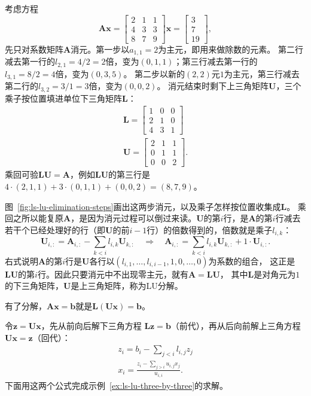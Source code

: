 \begin{example}[三阶消元与LU分解]
\label{ex:ls-lu-three-by-three}
考虑方程
\[
 \bm A\bm x=\begin{bmatrix}2&1&1\\4&3&3\\8&7&9\end{bmatrix}\bm x
 =\begin{bmatrix}3\\7\\19\end{bmatrix},
\]
先只对系数矩阵$\bm A$消元。第一步以$a_{1,1}=2$为主元，即用来做除数的元素。
第二行减去第一行的$l_{2,1}=4/2=2$倍，变为$(0,1,1)$；第三行减去第一行的$l_{3,1}=8/2=4$倍，变为$(0,3,5)$。
第二步以新的$(2,2)$元$1$为主元，第三行减去第二行的$l_{3,2}=3/1=3$倍，变为$(0,0,2)$。
消元结束时剩下上三角矩阵$\bm U$，三个乘子按位置填进单位下三角矩阵$\bm L$：
\[
\begin{gathered}
\bm L=\begin{bmatrix}1&0&0\\2&1&0\\4&3&1\end{bmatrix}\\
\bm U=\begin{bmatrix}2&1&1\\0&1&1\\0&0&2\end{bmatrix}.
\end{gathered}
\]
乘回可验$\bm L\bm U=\bm A$，例如$\bm L\bm U$的第三行是$4\cdot(2,1,1)+3\cdot(0,1,1)+(0,0,2)=(8,7,9)$。
\end{example}

图~\ref{fig:ls-lu-elimination-steps}画出这两步消元，以及乘子怎样按位置收集成$\bm L$。
乘回之所以能复原$\bm A$，是因为消元过程可以倒过来读。$\bm U$的第$i$行，是$\bm A$的第$i$行减去
若干个已经处理好的行（即$\bm U$的前$i-1$行）的倍数得到的，倍数就是乘子$l_{i,k}$：
\[
 \bm U_{i,:}=\bm A_{i,:}-\sum_{k<i}l_{i,k}\bm U_{k,:}
 \quad\Longrightarrow\quad
 \bm A_{i,:}=\sum_{k<i}l_{i,k}\bm U_{k,:}+1\cdot\bm U_{i,:}.
\]
右式说明$\bm A$的第$i$行是$\bm U$各行以$(l_{i,1},\ldots,l_{i,i-1},1,0,\ldots,0)$为系数的组合，
这正是$\bm L\bm U$的第$i$行。因此只要消元中不出现零主元，就有$\bm A=\bm L\bm U$，
其中$\bm L$是对角元为$1$的下三角矩阵，$\bm U$是上三角矩阵，称为LU分解。

有了分解，$\bm A\bm x=\bm b$就是$\bm L(\bm U\bm x)=\bm b$。

令$\bm z=\bm U\bm x$，先从前向后解下三角方程
$\bm L\bm z=\bm b$（前代），再从后向前解上三角方程$\bm U\bm x=\bm z$（回代）：
\begin{equation}
\begin{gathered}
z_i=b_i-\sum_{j<i}l_{i,j}z_j\\
x_i=\frac{z_i-\sum_{j>i}u_{i,j}x_j}{u_{i,i}}.
\end{gathered}
\end{equation}
下面用这两个公式完成示例~\ref{ex:ls-lu-three-by-three}的求解。

